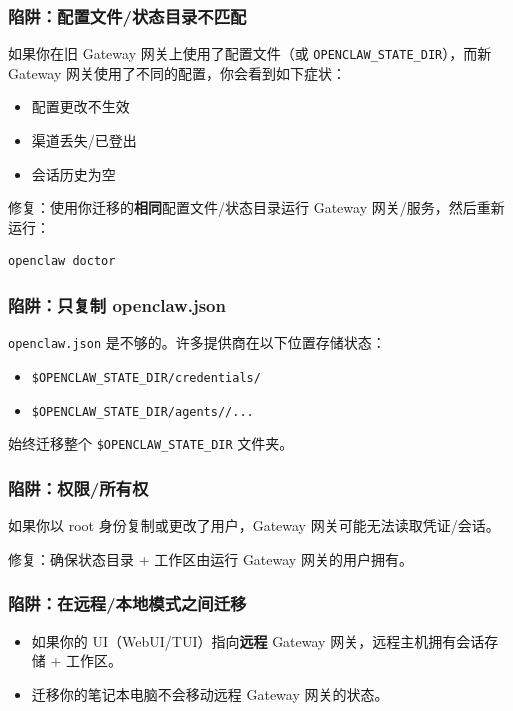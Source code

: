 \subsubsection{陷阱：配置文件/状态目录不匹配}


如果你在旧 Gateway 网关上使用了配置文件（或 \texttt{OPENCLAW\_STATE\_DIR}），而新 Gateway 网关使用了不同的配置，你会看到如下症状：

\begin{itemize}
  \item 配置更改不生效
  \item 渠道丢失/已登出
  \item 会话历史为空
\end{itemize}


修复：使用你迁移的\textbf{相同}配置文件/状态目录运行 Gateway 网关/服务，然后重新运行：

\begin{lstlisting}[language=bash]
openclaw doctor
\end{lstlisting}


\subsubsection{陷阱：只复制 openclaw.json}


\texttt{openclaw.json} 是不够的。许多提供商在以下位置存储状态：

\begin{itemize}
  \item \texttt{\$OPENCLAW\_STATE\_DIR/credentials/}
  \item \texttt{\$OPENCLAW\_STATE\_DIR/agents//...}
\end{itemize}


始终迁移整个 \texttt{\$OPENCLAW\_STATE\_DIR} 文件夹。

\subsubsection{陷阱：权限/所有权}


如果你以 root 身份复制或更改了用户，Gateway 网关可能无法读取凭证/会话。

修复：确保状态目录 + 工作区由运行 Gateway 网关的用户拥有。

\subsubsection{陷阱：在远程/本地模式之间迁移}


\begin{itemize}
  \item 如果你的 UI（WebUI/TUI）指向\textbf{远程} Gateway 网关，远程主机拥有会话存储 + 工作区。
  \item 迁移你的笔记本电脑不会移动远程 Gateway 网关的状态。
\end{itemize}


